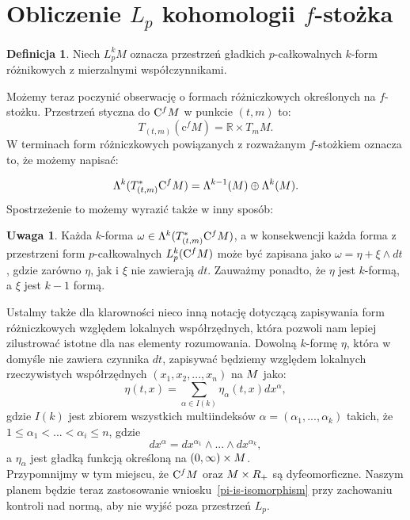 \documentclass[licencjacka]{pracamgr}
\theoremstyle{definition}
\newtheorem{definition}{Definicja}[section]
\theoremstyle{definition}
\newtheorem{remark}{Uwaga}[section]
\theoremstyle{plain}
\theoremstyle{plain}
\theoremstyle{plain}
\theoremstyle{plain}
\def\cfm{\ensuremath\mathrm{C}^fM}
\def\M{\ensuremath M}
\begin{document}
\section{Obliczenie $L_p$ kohomologii $f$-stożka}


\begin{definition}
  Niech $L_p^k M$ oznacza przestrzeń gładkich $p$-całkowalnych 
  $k$-form różnikowych z mierzalnymi  współczynnikami.
\end{definition}


Możemy teraz poczynić obserwację o formach różniczkowych określonych na 
$f$-stożku. Przestrzeń styczna do $\cfm$ w punkcie $(t, m)$ to:
\[
    T_{(t, m)} (\mathrm{c}^f M) = \mathbb{R} \times T_m M.
\]
W terminach form różniczkowych powiązanych z rozważanym $f$-stożkiem oznacza
to, że możemy napisać:

\[
\Lambda^k( T_{(t,m)}^\ast \cfm) = 
\Lambda^{k-1}(\M)  \oplus \Lambda^k(\M).
\]
Spostrzeżenie to możemy wyrazić także w inny sposób: 

\begin{remark}
  Każda $k$-forma $\omega \in \Lambda^k( T_{(t,m)}^\ast \cfm)$, 
a w konsekwencji każda forma z przestrzeni form $p$-całkowalnych  $L_p^k
(\cfm)$ może być zapisana jako $\omega = \eta + \xi \wedge dt$,
gdzie zarówno $\eta$, jak i  $\xi$ nie zawierają $dt$.  Zauważmy ponadto,
że $\eta$ jest $k$-formą, a $\xi$ jest $k-1$ formą. \\
\end{remark}

Ustalmy także dla klarowności nieco inną notację dotyczącą zapisywania
form różniczkowych względem lokalnych współrzędnych, która pozwoli nam 
lepiej zilustrować istotne dla nas elementy rozumowania. Dowolną $k$-formę $\eta$,
która w domyśle nie zawiera czynnika $dt$, zapisywać będziemy względem
lokalnych rzeczywistych współrzędnych
$(x_1, x_2, ... , x_n)$ na $\M$ jako:
\[
    \eta(t, x) = \sum_{\alpha \in I(k)} \eta_\alpha (t, x) dx^\alpha,
\]
gdzie $I(k)$ jest zbiorem wszystkich multiindeksów $\alpha = (\alpha_1, ...,
\alpha_k)$ takich, że $1 \leq \alpha_1 < ... < \alpha_i \leq n$, gdzie
\begin{equation}\label{notacja}
    dx^\alpha = dx^{\alpha_1} \wedge ... \wedge dx^{\alpha_k},
\end{equation}
a $\eta_\alpha$ jest gładką funkcją określoną na $(0, \infty) \times \M$. \\

Przypomnijmy w tym miejscu, że $\cfm$ oraz $\M \times R_+$ są
dyfeomorficzne.  Naszym planem będzie teraz zastosowanie
wniosku~\ref{pi-is-isomorphism} przy zachowaniu kontroli nad normą,
aby nie wyjść poza przestrzeń $L_p$. \\
\end{document}
